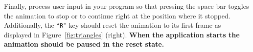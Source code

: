 \documentclass[12pt, a4paper, oneside, ngerman]{article}
\begin{document}
Finally, process user input in your program so that pressing the space bar toggles the animation to stop or to continue right at the position where it stopped. Additionally, the \enquote{\texttt{R}}-key should reset the animation to its first frame as displayed in Figure~\ref{fig:triangles} (right). \textbf{When the application starts the animation should be paused in the reset state.}
\end{document}
